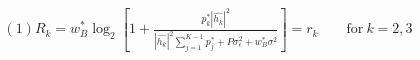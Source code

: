 \documentclass[preview]{standalone}
\begin{document}
\begin{align*}
(1) R_k = w_B^\ast \log_2 \left[1 + \frac{p_k^\ast \left|\hat{h_k}\right|^2}{\left|\hat{h_k}\right|^2 \sum_{j=1}^{K-1} {p_j^\ast} + P \sigma_{\epsilon}^2 + w_B^\ast \sigma^2}\right] = r_k \qquad \text{for} \ k = 2, 3
\end{align*}
\end{document}
